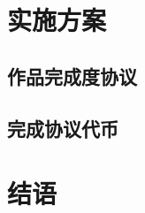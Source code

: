\documentclass[11pt,UTF8,a4paper]{ctexart}
\begin{document}
    \section{实施方案}\label{sec:solution}

    \subsection{作品完成度协议}\label{subsec:wca}

    \subsection{完成协议代币}\label{subsec:cat}


    \section{结语}\label{sec:end}

    
    
\end{document}
